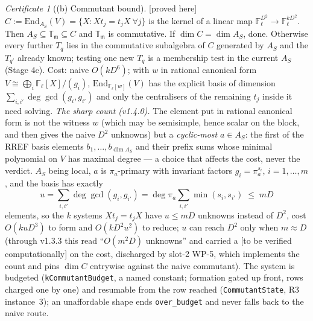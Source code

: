 \documentclass[11pt]{article}
\theoremstyle{remark}
\newtheorem{certificate}[theorem]{Certificate}
\newcommand{\F}{\mathbb{F}}
\newcommand{\End}{\mathrm{End}}
\newcommand{\Fl}{\F_\ell}
\newcommand{\T}{\mathbb{T}}
\newcommand{\m}{\mathfrak{m}}
\newcommand{\PROVED}{\textsf{[proved here]}}
\newcommand{\VERIFY}{\textsf{[to be verified computationally]}}
\begin{document}
\begin{certificate}[(b) Commutant bound]\label{cert:comm}\PROVED\
$C:=\End_{A_S}(V)=\{X:Xt_j=t_jX\ \forall j\}$ is the kernel of a linear map
$\Fl^{D^2}\to\Fl^{kD^2}$. Then $A_S\subseteq\T_\m\subseteq C$ and $\T_\m$ is commutative. If
$\dim C=\dim A_S$, done. Otherwise every further $T_q$ lies in the commutative subalgebra of $C$
generated by $A_S$ and the $T_{q'}$ already known; testing one new $T_q$ is a membership test in
the current $A_S$ (Stage 4c). Cost: naive $O(kD^6)$; with $w$ in rational canonical form
$V\cong\bigoplus_i\Fl[X]/(g_i)$, $\End_{\Fl[w]}(V)$ has the explicit basis of dimension
$\sum_{i,i'}\deg\gcd(g_i,g_{i'})$ and only the centralisers of the remaining $t_j$ inside it
need solving. \emph{The sharp count (v1.4.0).} The element put in rational canonical form is
not the witness $w$ (which may be semisimple, hence scalar on the block, and then gives the
naive $D^2$ unknowns) but a \emph{cyclic-most} $a\in A_S$: the first of the RREF basis elements
$b_1,\dots,b_{\dim A_S}$ and their prefix sums whose minimal polynomial on $V$ has maximal
degree --- a choice that affects the cost, never the verdict. $A_S$ being local, $a$ is
$\pi_a$-primary with invariant factors $g_i=\pi_a^{s_i}$, $i=1,\dots,m$, and the basis has
exactly
\[
u=\sum_{i,i'}\deg\gcd(g_i,g_{i'})=\deg\pi_a\sum_{i,i'}\min(s_i,s_{i'})\;\le\;mD
\]
elements, so the $k$ systems $Xt_j=t_jX$ have $u\le mD$ unknowns instead of $D^2$, cost
$O(kuD^3)$ to form and $O(kD^2u^2)$ to reduce; $u$ can reach $D^2$ only when $m\approx D$
(through v1.3.3 this read ``$O(m^2D)$ unknowns'' and carried a \VERIFY{} on the cost, discharged
by slot-2 WP-5, which implements the count and pins $\dim C$ entrywise against the naive
commutant). The system is budgeted (\texttt{kCommutantBudget}, a named constant; formation gated
up front, rows charged one by one) and resumable from the row reached
(\texttt{CommutantState}, R3 instance~3); an unaffordable shape ends \texttt{over\_budget} and
never falls back to the naive route.


\end{certificate}
\end{document}
